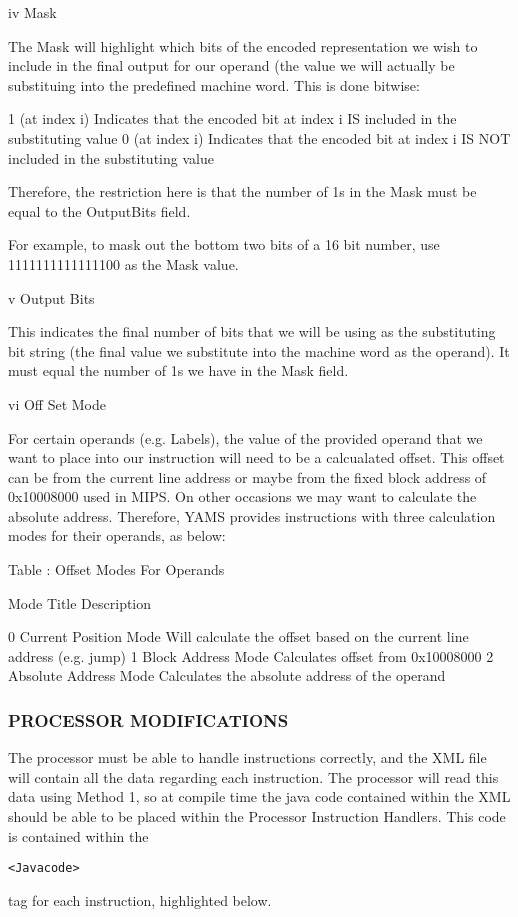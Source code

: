 \documentclass[12pt]{report}
\begin{document}
\begin{enumerate}
iv	Mask

The Mask will highlight which bits of the encoded representation we wish to include in the final output for our operand (the value we will actually be substituing into the predefined machine word. This is done bitwise:

1 (at index i)	Indicates that the encoded bit at index i IS included in the substituting value
0 (at index i)	Indicates that the encoded bit at index i IS NOT included in the substituting value

Therefore, the restriction here is that the number of 1s in the Mask must be equal to the OutputBits field.

For example, to mask out the bottom two bits of a 16 bit number, use 1111111111111100 as the Mask value.

v	Output Bits

This indicates the final number of bits that we will be using as the substituting bit string (the final value we substitute into the machine word as the operand). It must equal the number of 1s we have in the Mask field.

vi	Off Set Mode

For certain operands (e.g. Labels), the value of the provided operand that we want to place into our instruction will need to be a calcualated offset. This offset can be from the current line address or maybe from the fixed block address of 0x10008000 used in MIPS. On other occasions we may want to calculate the absolute address. Therefore, YAMS provides instructions with three calculation modes for their operands, as below:

Table : Offset Modes For Operands

Mode	Title			Description

0 	Current Position Mode	Will calculate the offset based on the current line address (e.g. jump)
1 	Block Address Mode	Calculates offset from 0x10008000
2 	Absolute Address Mode	Calculates the absolute address of the operand

\subsubsection{PROCESSOR MODIFICATIONS}

The processor must be able to handle instructions correctly, and the XML file will contain all the data regarding each instruction. The processor will read this data using Method 1, so at compile time the java code contained within the XML should be able to be placed within the Processor Instruction Handlers. This code is contained within the \begin{verbatim}<Javacode>\end{verbatim} tag for each instruction, highlighted below.


\end{enumerate}
\end{document}
